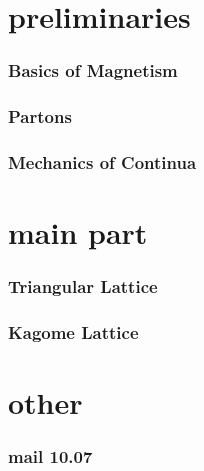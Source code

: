 \documentclass{article}
\begin{document}
\tableofcontents

\newpage
\part{preliminaries}

\section{Basics of Magnetism}


\section{Partons}


\section{Mechanics of Continua}


\newpage
\part{main part}

\section{Triangular Lattice}


\section{Kagome Lattice}


\newpage
\part{other}

\section{mail 10.07}

\end{document}
